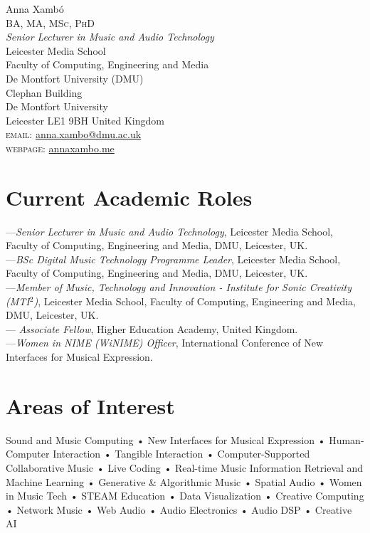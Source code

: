 \documentclass[10pt, a4paper]{article}
\begin{document}
{\Huge Anna Xambó}\\[0.1cm]
\textsc{BA, MA, MSc, PhD}\\[0.9cm]
\emph{Senior Lecturer in Music and Audio Technology}\\
Leicester Media School\\
Faculty of Computing, Engineering and Media\\
De Montfort University (DMU)\\
Clephan Building \\
De Montfort University\\
Leicester LE1 9BH United Kingdom\\[.2cm]
\textsc{email}: \href{mailto:anna.xambo@dmu.ac.uk}{anna.xambo@dmu.ac.uk}\\
\textsc{webpage}: \href{http://annaxambo.me/}{annaxambo.me}

\section*{Current Academic Roles}
---\emph{Senior Lecturer in Music and Audio Technology}, Leicester Media School, Faculty of Computing, Engineering and Media, DMU, Leicester, UK.\\
---\emph{BSc Digital Music Technology Programme Leader}, Leicester Media School, Faculty of Computing, Engineering and Media, DMU, Leicester, UK.\\
---\emph{Member of Music, Technology and Innovation - Institute for Sonic Creativity (MTI${^2}$)}, Leicester Media School, Faculty of Computing, Engineering and Media, DMU, Leicester, UK.\\
---\emph{ Associate Fellow}, Higher Education Academy, United Kingdom.\\
---\emph{Women in NIME (WiNIME) Officer}, International Conference of New Interfaces for Musical Expression.
\section*{Areas of Interest}
Sound and Music Computing • New Interfaces for Musical Expression • Human-Computer Interaction • Tangible Interaction • Computer-Supported Collaborative Music • Live Coding • Real-time Music Information Retrieval and Machine Learning • Generative \& Algorithmic Music • Spatial Audio • Women in Music Tech • STEAM Education • Data Visualization • Creative Computing • Network Music • Web Audio • Audio Electronics • Audio DSP • Creative AI
\end{document}
